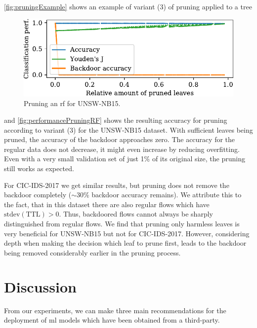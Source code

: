 \documentclass[10pt,sigconf,letterpaper,dvipsnames]{acmart}
\newcommand\note[2]{{\color{#1}#2}}
\newcommand\todo[1]{{\note{red}{TODO: #1}}}
\newcommand{\unsw}{UNSW-NB15}
\newcommand{\cic}{CIC-IDS-2017}
\begin{document}
\autoref{fig:pruningExample} shows an example of variant (3) of pruning applied to a tree
\begin{figure}[h]
\includegraphics[width=\columnwidth]{../prune_CAIA_backdoor_15/prune_oh_d.pdf}
\caption{Pruning an \gls{rf} for \unsw{}.}
\label{fig:performancePruningRF}
\end{figure}
and \autoref{fig:performancePruningRF} shows the resulting accuracy for pruning according to variant (3) for the \unsw{} dataset. With sufficient leaves being pruned, the accuracy of the backdoor approaches zero. The accuracy for the regular data does not decrease, it might even increase by
reducing overfitting. %
Even with a very small validation set of just 1\% of its original size, the pruning still works as expected.

For \cic{} we get similar results, but pruning does not remove the backdoor completely ($\sim$30\% backdoor accuracy remains). We attribute this to the fact, that in this dataset there are also regular flows which have $\text{stdev}(\text{TTL}) > 0$. Thus, backdoored flows cannot always be sharply distinguished from regular flows. We find that pruning only harmless leaves is very beneficial for \unsw{} but not for \cic{}. However, considering depth when making the decision which leaf to prune first, leads to the backdoor being removed considerably earlier in the pruning process.


\section{Discussion}
From our experiments, we can make three main recommendations for the deployment of \gls{ml} models which have been obtained from a third-party.
\end{document}
